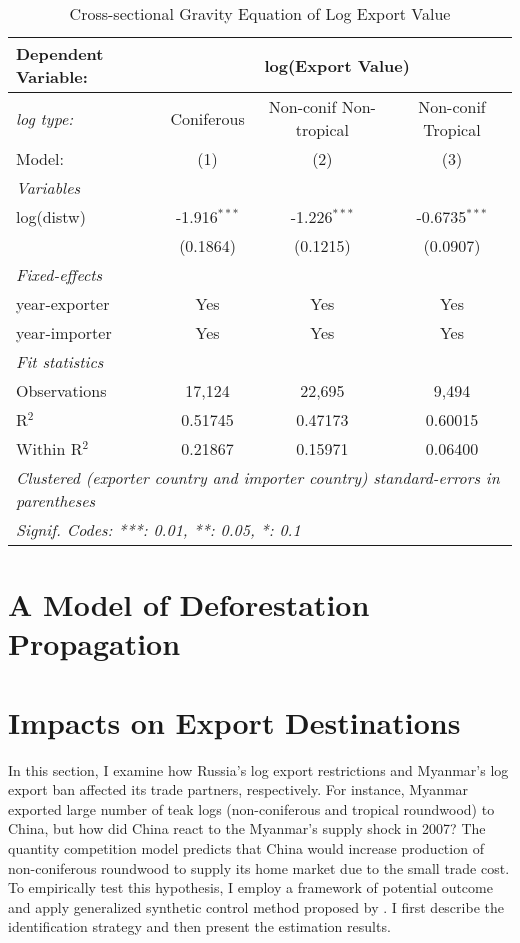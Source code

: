 \documentclass[a4paper,12pt]{article}
\begin{document}
   \begin{table}[H]
    \caption{Cross-sectional Gravity Equation of Log Export Value}
    \centering
    \begin{tabular}{lccc}
       \tabularnewline \midrule \midrule
       Dependent Variable: & \multicolumn{3}{c}{log(Export Value)}\\
       \midrule
       \textit{log type: } & Coniferous & Non-conif Non-tropical & Non-conif Tropical\\
       Model:                             & (1)            & (2)            & (3)\\  
       \midrule
       \emph{Variables}\\
       log(distw)                         & -1.916$^{***}$ & -1.226$^{***}$ & -0.6735$^{***}$\\   
       & (0.1864)       & (0.1215)       & (0.0907)\\   
        \midrule
        \emph{Fixed-effects}\\
        year-exporter  & Yes            & Yes            & Yes\\  
        year-importer   & Yes            & Yes            & Yes\\  
        \midrule
        \emph{Fit statistics}\\
        Observations                       & 17,124         & 22,695         & 9,494\\  
        R$^2$                              & 0.51745        & 0.47173        & 0.60015\\  
        Within R$^2$                       & 0.21867        & 0.15971        & 0.06400\\  
        \midrule \midrule
        \multicolumn{4}{l}{\emph{Clustered (exporter country and importer country) standard-errors in parentheses}}\\
        \multicolumn{4}{l}{\emph{Signif. Codes: ***: 0.01, **: 0.05, *: 0.1}}\\
    \end{tabular}
 \end{table}

\section{A Model of Deforestation Propagation}

\section{Impacts on Export Destinations}
In this section, I examine how Russia's log export restrictions and Myanmar's log export ban affected its trade partners, respectively. For instance, Myanmar exported large number of teak logs (non-coniferous and tropical roundwood) to China, but how did China react to the Myanmar's supply shock in 2007? The quantity competition model predicts that China would increase production of non-coniferous roundwood to supply its home market due to the small trade cost. To empirically test this hypothesis, I employ a framework of potential outcome and apply generalized synthetic control method proposed by \cite{xu2017generalized}. I first describe the identification strategy and then present the estimation results.
\end{document}
